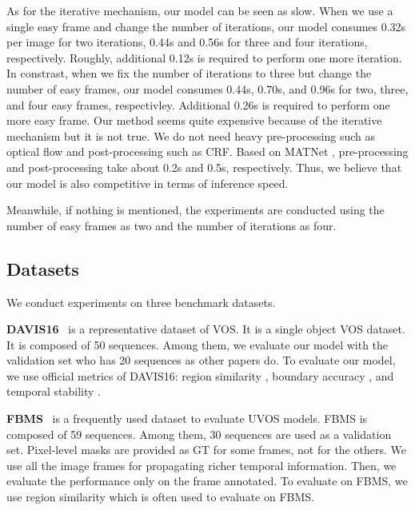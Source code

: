 \documentclass[letterpaper]{article} \usepackage{aaai22}  \usepackage{times}  \usepackage{helvet}  \usepackage{courier}  \usepackage[hyphens]{url}  \usepackage{graphicx} \urlstyle{rm} \def\UrlFont{\rm}  \usepackage{natbib}  \usepackage{caption} \DeclareCaptionStyle{ruled}{labelfont=normalfont,labelsep=colon,strut=off} \frenchspacing  \setlength{\pdfpagewidth}{8.5in}  \setlength{\pdfpageheight}{11in}  \usepackage{algorithm}
\renewcommand{\paragraph}[1]{\vspace{1mm}\noindent\textbf{#1}}
\begin{document}
As for the iterative mechanism, our model can be seen as slow.
When we use a single easy frame and change the
number of iterations, our model consumes 0.32s per image
for two iterations, 0.44s and 0.56s for three and four iterations, respectively. Roughly, additional 0.12s is required to perform one more iteration. In constrast, when we fix the
number of iterations to three but change the number of easy
frames, our model consumes 0.44s, 0.70s, and 0.96s for two,
three, and four easy frames, respectivley. Additional 0.26s is
required to perform one more easy frame. Our method seems
quite expensive because of the iterative mechanism but it is
not true. We do not need heavy pre-processing such as optical flow and post-processing such as CRF. Based on MATNet \citep{zhou2020motion}, pre-processing and post-processing take about 0.2s and
0.5s, respectively. Thus, we believe that our model is also
competitive in terms of inference speed.

Meanwhile, if nothing is mentioned, the experiments are conducted using the number of easy frames as two and the number of iterations as four. 

\subsection{Datasets}

We conduct experiments on three benchmark datasets.

\paragraph{DAVIS16}~\citep{Perazzi2016} is a representative dataset of VOS. It is a single object VOS dataset. It is composed of 50 sequences. Among them, we evaluate our model with the validation set who has 20 sequences as other papers do. To evaluate our model, we use official metrics of DAVIS16: region similarity , boundary accuracy , and temporal stability .

\paragraph{FBMS}~\citep{ochs2013segmentation} is a frequently used dataset to evaluate UVOS models. FBMS is composed of 59 sequences. Among them, 30 sequences are used as a validation set. Pixel-level masks are provided as GT for some frames, not for the others. We use all the image frames for propagating richer temporal information. Then, we evaluate the performance only on the frame annotated. To evaluate on FBMS, we use region similarity  which is often used to evaluate on FBMS. 
\end{document}
